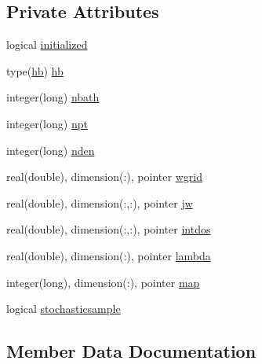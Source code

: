 \subsection*{Private Attributes}
\begin{DoxyCompactItemize}
\item 
logical \hyperlink{structharmonicbath__class_1_1harmonicbath_a876fbdf98da8f3bfeb4b4e03b58d6f74}{initialized}
\item 
type(\hyperlink{structhb__class_1_1hb}{hb}) \hyperlink{structharmonicbath__class_1_1harmonicbath_a7b59e71a4b2100f821d091a5193d50f5}{hb}
\item 
integer(long) \hyperlink{structharmonicbath__class_1_1harmonicbath_ad55e02fae968c36f82bcfa4faf61d978}{nbath}
\item 
integer(long) \hyperlink{structharmonicbath__class_1_1harmonicbath_ab292a58613813f3ee812f949f9899089}{npt}
\item 
integer(long) \hyperlink{structharmonicbath__class_1_1harmonicbath_a87afd4834fce3bda38f7c49ecb203121}{nden}
\item 
real(double), dimension(\+:), pointer \hyperlink{structharmonicbath__class_1_1harmonicbath_a4268e843792e21ac9c78224a9e540e1f}{wgrid}
\item 
real(double), dimension(\+:,\+:), pointer \hyperlink{structharmonicbath__class_1_1harmonicbath_a5d4365532fe5feb53eb8bf06a64c8bcc}{jw}
\item 
real(double), dimension(\+:,\+:), pointer \hyperlink{structharmonicbath__class_1_1harmonicbath_aded5880e44b831dddae5be30966594e4}{intdos}
\item 
real(double), dimension(\+:), pointer \hyperlink{structharmonicbath__class_1_1harmonicbath_abdcf7e97525bd1bd424af202df2c5253}{lambda}
\item 
integer(long), dimension(\+:), pointer \hyperlink{structharmonicbath__class_1_1harmonicbath_a080d6ce6fdb6481bb8851b4fbc24a995}{map}
\item 
logical \hyperlink{structharmonicbath__class_1_1harmonicbath_a1ae24e6ddcc5e0a0b80decc16a0865cb}{stochasticsample}
\end{DoxyCompactItemize}


\subsection{Member Data Documentation}
\mbox{\label{structharmonicbath__class_1_1harmonicbath_a7b59e71a4b2100f821d091a5193d50f5}} 
